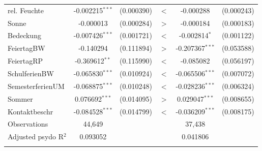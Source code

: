 \documentclass[a4paper,12pt]{thesis}
\begin{document}
\begin{table}[!htbp]
\begin{tabular}{@{\extracolsep{-5pt}}lccccc}
		rel. Feuchte & -0.002215$^{***}$ & (0.000390) & $<$ & -0.000288 & (0.000243)\\ 
		
		Sonne & -0.000013 & (0.000284) & $>$ & -0.000184 & (0.000183)\\ 
		
		Bedeckung & -0.007426$^{***}$ & (0.001721) & $<$ & -0.002814$^{*}$ & (0.001122)\\ 
		
		FeiertagBW & -0.140294 & (0.111894) & $>$ & -0.207367$^{***}$ & (0.053588)\\ 
		
		FeiertagRP & -0.369612$^{**}$ & (0.115990) & $<$ & -0.085082 & (0.056197)\\ 
		
		SchulferienBW & -0.065830$^{***}$ & (0.010924) & $<$ & -0.065506$^{***}$ & (0.007072)\\ 
		
		SemesterferienUM & -0.068875$^{***}$ & (0.010248) & $<$ & -0.028236$^{***}$ & (0.006324)\\ 
		
		Sommer & 0.076692$^{***}$ & (0.014095) & $>$ & 0.029047$^{***}$ & (0.008655)\\ 
		
		Kontaktbeschr & -0.084528$^{***}$ & (0.014799) & $<$ & -0.036209$^{***}$ & (0.008175)\\ 
		
		Observations & 44,649 & & & 37,438 & \\ 
		Adjusted psydo R$^{2}$ & 0.093052 & & & 0.041806 & \\  
		\hline \\[-1.8ex] 
	\end{tabular} 
\end{table} 

\newpage
{}

\end{document}

